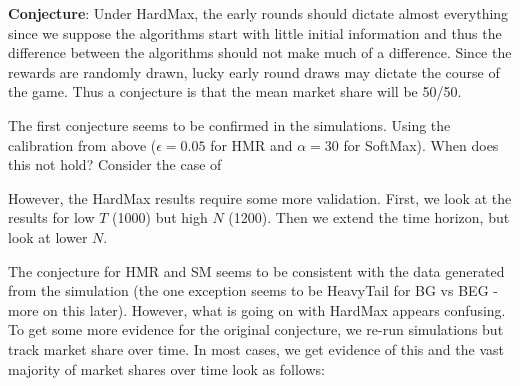 \documentclass[11pt,letterpaper]{article}
\begin{document}
\textbf{Conjecture}: Under HardMax, the early rounds should dictate almost everything since we suppose the algorithms start with little initial information and thus the difference between the algorithms should not make much of a difference. Since the rewards are randomly drawn, lucky early round draws may dictate the course of the game. Thus a conjecture is that the mean market share will be 50/50.

The first conjecture seems to be confirmed in the simulations. Using the calibration from above ($\epsilon = 0.05$ for HMR and $\alpha = 30$ for SoftMax). When does this not hold? Consider the case of 


However, the HardMax results require some more validation. First, we look at the results for low $T$ (1000) but high $N$ (1200). Then we extend the time horizon, but look at lower $N$.



The conjecture for HMR and SM seems to be consistent with the data generated from the simulation (the one exception seems to be HeavyTail for BG vs BEG - more on this later). However, what is going on with HardMax appears confusing. To get some more evidence for the original conjecture, we re-run simulations but track market share over time. In most cases, we get evidence of this and the vast majority of market shares over time look as follows:
\end{document}
